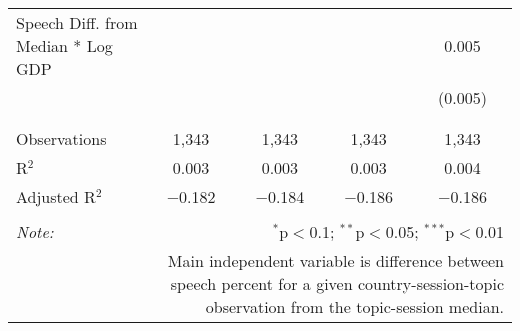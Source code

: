 \begin{table}[!htbp]
\begin{tabular}{@{\extracolsep{5pt}}lcccc}
 Speech Diff. from Median * Log GDP &  &  &  & 0.005 \\ 
  &  &  &  & (0.005) \\ 
  & & & & \\ 
\hline \\[-1.8ex] 
Observations & 1,343 & 1,343 & 1,343 & 1,343 \\ 
R$^{2}$ & 0.003 & 0.003 & 0.003 & 0.004 \\ 
Adjusted R$^{2}$ & $-$0.182 & $-$0.184 & $-$0.186 & $-$0.186 \\ 
\hline 
\hline \\[-1.8ex] 
\textit{Note:}  & \multicolumn{4}{r}{$^{*}$p$<$0.1; $^{**}$p$<$0.05; $^{***}$p$<$0.01} \\ 
 & \multicolumn{4}{r}{Main independent variable is difference between speech percent for a given country-session-topic observation from the topic-session median.} \\ 
\end{tabular} 
\end{table} 
